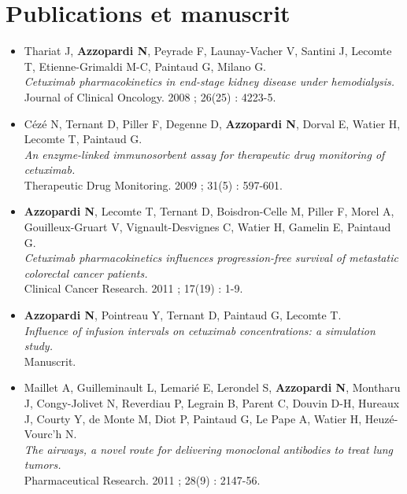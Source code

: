 \chapter*{Publications et manuscrit}

\begin{itemize}
\item Thariat J, \textbf{Azzopardi N}, Peyrade F, Launay-Vacher V, Santini J, Lecomte T, Etienne-Grimaldi M-C, Paintaud G, Milano G.\\
\textit{Cetuximab pharmacokinetics in end-stage kidney disease under hemodialysis.}\\
Journal of Clinical Oncology. 2008 ; 26(25) : 4223-5.
\\
\item Cézé N, Ternant D, Piller F, Degenne D, \textbf{Azzopardi N}, Dorval E, Watier H, Lecomte T, Paintaud G.\\
\textit{An enzyme-linked immunosorbent assay for therapeutic drug monitoring of cetuximab.}\\
Therapeutic Drug Monitoring. 2009 ; 31(5) : 597-601.
\\
\item \textbf{Azzopardi N}, Lecomte T, Ternant D, Boisdron-Celle M, Piller F, Morel A, Gouilleux-Gruart V, Vignault-Desvignes C, Watier H, Gamelin E, Paintaud G.\\
\textit{Cetuximab pharmacokinetics influences progression-free survival of metastatic colorectal cancer patients.}\\
Clinical Cancer Research. 2011 ; 17(19) : 1-9.
\\
\item \textbf{Azzopardi N}, Pointreau Y, Ternant D, Paintaud G, Lecomte T.\\
\textit{Influence of infusion intervals on cetuximab concentrations: a simulation study.}\\
Manuscrit.
\\
\item Maillet A, Guilleminault L, Lemarié E, Lerondel S, \textbf{Azzopardi N}, Montharu J, Congy-Jolivet N, Reverdiau P, Legrain B, Parent C, Douvin D-H, Hureaux J, Courty Y, de Monte M, Diot P, Paintaud G, Le Pape A, Watier H, Heuzé-Vourc'h N.\\
\textit{The airways, a novel route for delivering monoclonal antibodies to treat lung tumors.}\\
Pharmaceutical Research. 2011 ; 28(9) : 2147-56.
\end{itemize}
